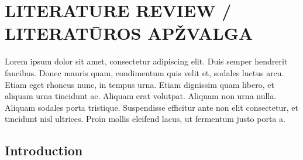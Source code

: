 
\def \mychapter {
\titleformat{\chapter}[display]
{\normalfont}{-}{-10mm}{\thechapter . \centering\normalfont\MakeUppercase}
} 



\setcounter{chapter}{0}
\chapter{\MakeUppercase{Literature review / Literatūros apžvalga}} %
\label{cha:review}

Lorem ipsum dolor sit amet, consectetur adipiscing elit. Duis semper hendrerit faucibus. Donec mauris quam, condimentum quis velit et, sodales luctus arcu. Etiam eget rhoncus nunc, in tempus urna. Etiam dignissim quam libero, et aliquam urna tincidunt ac. Aliquam erat volutpat. Aliquam non urna nulla. Aliquam sodales porta tristique. Suspendisse efficitur ante non elit consectetur, et tincidunt nisl ultrices. Proin mollis eleifend lacus, ut fermentum justo porta a.


\section{Introduction}
\label{sec:introduction}

